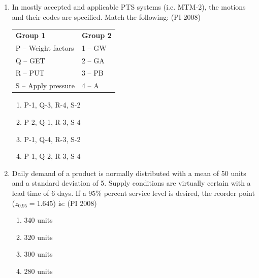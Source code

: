 \documentclass[journal,12pt,onecolumn]{IEEEtran}
\theoremstyle{remark}
\begin{document}
\begin{enumerate}
The percentage utilization of labour on the assembly line is:  

\begin{multicols}{4}
    \begin{enumerate}
\item a) 20.37
\item b) 25.58 
\item c) 26.63  
\item d) 79.62
 \end{enumerate}
\end{multicols}
\vspace{1cm}
\item %
In mostly accepted and applicable PTS systems (i.e. MTM-2), the motions and their codes are specified. Match the following:
\hfill{(PI 2008)}\\
\vspace{1cm}
\begin{tabular}{ll}
\textbf{Group 1} & \textbf{Group 2} \\
P -- Weight factors & 1 -- GW \\
Q -- GET            & 2 -- GA \\
R -- PUT            & 3 -- PB \\
S -- Apply pressure & 4 -- A \\
\end{tabular}

\begin{multicols}{4}
    \begin{enumerate}
\item  P-1, Q-3, R-4, S-2 
\item P-2, Q-1, R-3, S-4 
\item P-1, Q-4, R-3, S-2 
\item P-1, Q-2, R-3, S-4

 \end{enumerate}
\end{multicols}
\vspace{1cm}
\item %
Daily demand of a product is normally distributed with a mean of 50 units and a standard deviation of 5. Supply conditions are virtually certain with a lead time of 6 days. If a 95\% percent service level is desired, the reorder point ($z_{0.95} = 1.645$) is:
\hfill{(PI 2008)}
\begin{multicols}{4}
    \begin{enumerate}
\item  340 units 
\item  320 units 
\item  300 units
\item  280 units


\end{enumerate}
\end{multicols}
\end{enumerate}
\end{document}

